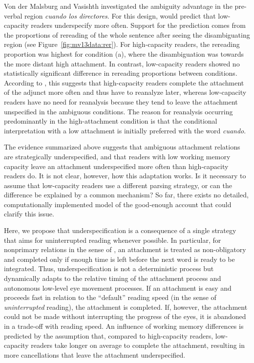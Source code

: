 \documentclass{cambridge7A}\usepackage[]{graphicx}\usepackage[]{color}
\begin{document}
Von der Malsburg and Vasishth investigated the ambiguity advantage in the pre-verbal region \textit{cuando los directores}. For this design, \cite{Traxler2007} would predict that low-capacity readers underspecify more often. Support for the \cite{Traxler2007} prediction  comes from the proportions of rereading of the whole sentence after seeing the disambiguating region (see Figure~\ref{fig:mv13data:rer}). 
For high-capacity readers, the rereading proportion was highest for condition (a), where the disambiguation was towards the more distant high attachment. In contrast, low-capacity readers showed no statistically significant difference in rereading proportions between conditions. According to \cite{MalsburgVasishth2013}, this suggests that high-capacity readers complete the attachment of the adjunct more often and thus have to reanalyze later, whereas low-capacity readers have no need for reanalysis because they tend to leave the attachment unspecified in the ambiguous conditions. The reason for reanalysis occurring predominantly in the high-attachment condition is that the conditional interpretation with a low attachment is initially preferred with the word \textit{cuando}.

The evidence summarized above suggests that ambiguous attachment relations are strategically underspecified, and that readers with
low working memory capacity leave an attachment underspecified more often than high-capacity readers do. 
It is not clear, however, how this adaptation works. Is it necessary to assume that low-capacity readers use a different parsing strategy, or can the difference be explained by a common mechanism? So far, there exists no detailed, computationally implemented model of the good-enough account that could clarify this issue.

Here, we propose that underspecification is a consequence of a single strategy that aims for  uninterrupted reading whenever possible.
In particular, for nonprimary relations in the sense of \cite{FrazierClifton1997}, an attachment is treated as non-obligatory and completed only if enough time is left before the next word is ready to be integrated.
Thus, underspecification is not a deterministic process but dynamically adapts to the relative timing of the attachment process and autonomous low-level eye movement processes. If an attachment is easy and proceeds fast in relation to the ``default'' reading speed (in the sense of \emph{uninterrupted} reading), the attachment is completed. If, however, the attachment could not be made without interrupting the progress of the eyes, it is abandoned in a trade-off with reading speed. 
An influence of working memory differences is predicted by the assumption that, compared to high-capacity readers, low-capacity readers take longer on average to complete the attachment, resulting in more cancellations that leave the attachment underspecified.
\end{document}
